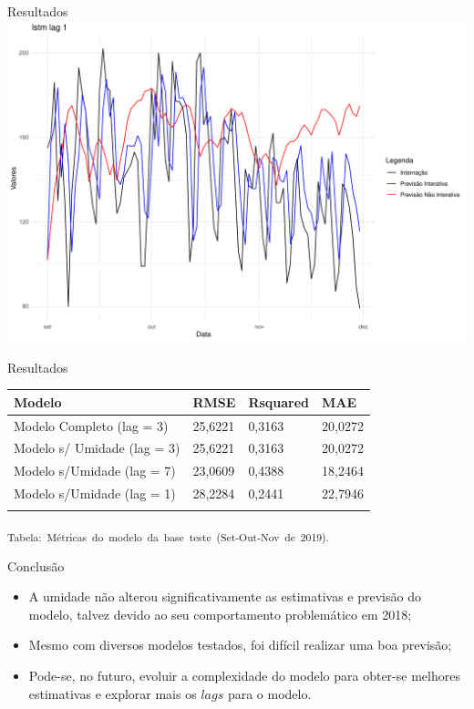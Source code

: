 \documentclass[
  ignorenonframetext,
]{beamer}
\providecommand{\tightlist}{%
  \setlength{\itemsep}{0pt}\setlength{\parskip}{0pt}}\usepackage{longtable,booktabs,array}
\begin{document}
\begin{frame}{Resultados}
\label{resultados-7}
\includegraphics[width=1\textwidth,height=\textheight]{apresentacao_files/figure-beamer/unnamed-chunk-16-1.pdf}
\end{frame}

\begin{frame}{Resultados}
\label{resultados-8}
\begin{longtable}[]{@{}llll@{}}
\toprule\noalign{}
Modelo & RMSE & Rsquared & MAE \\
\midrule\noalign{}
\endhead
Modelo Completo (lag = 3) & 25,6221 & 0,3163 & 20,0272 \\
Modelo s/ Umidade (lag = 3) & 25,6221 & 0,3163 & 20,0272 \\
Modelo s/Umidade (lag = 7) & 23,0609 & 0,4388 & 18,2464 \\
Modelo s/Umidade (lag = 1) & 28,2284 & 0,2441 & 22,7946 \\
\bottomrule\noalign{}
\end{longtable}

\textsubscript{Tabela:~Métricas~do~modelo~da~base~teste~(Set-Out-Nov~de~2019).}
\end{frame}

\begin{frame}{Conclusão}
\label{conclusuxe3o}
\begin{itemize}
\tightlist
\item
  A umidade não alterou significativamente as estimativas e previsão do
  modelo, talvez devido ao seu comportamento problemático em 2018;
\item
  Mesmo com diversos modelos testados, foi difícil realizar uma boa
  previsão;
\item
  Pode-se, no futuro, evoluir a complexidade do modelo para obter-se
  melhores estimativas e explorar mais os \(lags\) para o modelo.
\end{itemize}
\end{frame}
\end{document}
